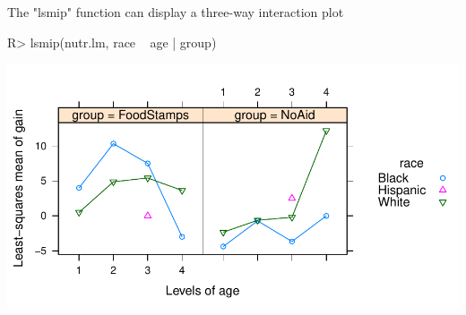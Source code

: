 \documentclass{article}
\begin{document}
The "lsmip" function can display a three-way interaction plot

\begin{Winput}
R> lsmip(nutr.lm, race ~ age | group)
\end{Winput}
\includegraphics[scale=.75]{using-lsmeans-nutr-intplot-fig.pdf}
\end{document}
